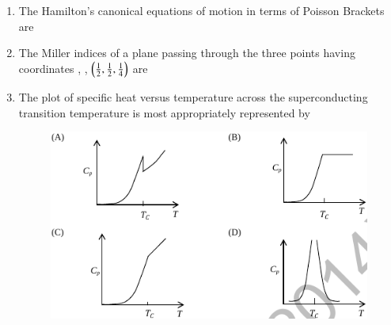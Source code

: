 \documentclass[journal,12pt,onecolumn]{IEEEtran}
\theoremstyle{remark}
\begin{document}
\begin{enumerate}
\item The Hamilton's canonical equations of motion in terms of Poisson Brackets are
\hfill{} \begin{enumerate}  \end{enumerate}

\item The Miller indices of a plane passing through the three points having coordinates , , $\left(\frac{1}{2}, \frac{1}{2}, \frac{1}{4}\right)$ are
\hfill{} \begin{enumerate}  \end{enumerate}

\item The plot of specific heat versus temperature across the superconducting transition temperature  is most appropriately represented by \\
\hfill{}
\begin{figure}[H]
\centering
 \caption*{} \label{fig:30o} \includegraphics[width=0.8\columnwidth]{figs/q30.png}
\end{figure}


\end{enumerate}
\end{document}
